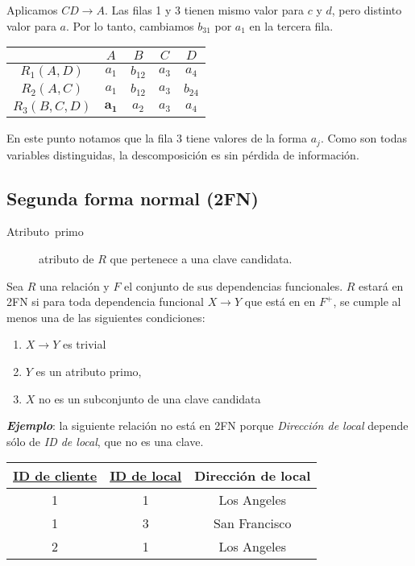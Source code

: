 \documentclass[a4paper, twoside]{article}
\begin{document}
Aplicamos $CD\to A$. Las filas 1 y 3 tienen mismo valor para $c$
y $d$, pero distinto valor para $a$. Por lo tanto, cambiamos $b_{31}$
por $a_{1}$ en la tercera fila.

\noindent \begin{center}
\begin{tabular}{|c|c|c|c|c|}
\hline 
 & $A$ & $B$ & $C$ & $D$\\
\hline 
\hline 
$R_{1}(A,D)$ & $a_{1}$ & $b_{12}$ & $a_{3}$ & $a_{4}$\\
\hline 
$R_{2}(A,C)$ & $a_{1}$ & $b_{12}$ & $a_{3}$ & $b_{24}$\\
\hline 
$R_{3}(B,C,D)$ & $\mathbf{a_{1}}$ & $a_{2}$ & $a_{3}$ & \textbf{$a_{4}$}\\
\hline 
\end{tabular}
\par\end{center}

En este punto notamos que la fila 3 tiene valores de la forma $a_{j}$.
Como son todas variables distinguidas, la descomposición es sin pérdida
de información.


\subsection{Segunda forma normal (2FN)}
\begin{description}
\item [{Atributo~primo}] atributo de $R$ que pertenece a una clave candidata.
\end{description}
Sea $R$ una relación y $F$ el conjunto de sus dependencias funcionales.
$R$ estará en 2FN si para toda dependencia funcional $X\to Y$ que
está en en $F^{+}$, se cumple al menos una de las siguientes condiciones:
\begin{enumerate}
\item $X\to Y$ es trivial
\item $Y$ es un atributo primo,
\item $X$ no es un subconjunto de una clave candidata
\end{enumerate}
\textbf{\emph{Ejemplo}}: la siguiente relación no está en 2FN porque
\emph{Dirección de local} depende sólo de \emph{ID de local}, que
no es una clave.

\noindent \begin{center}
\begin{tabular}{|c|c|c|}
\hline 
\uline{ID de cliente} & \uline{ID de local} & Dirección de local\\
\hline 
\hline 
1 & 1 & Los Angeles\\
\hline 
1 & 3 & San Francisco\\
\hline 
2 & 1 & Los Angeles\\
\hline 
\end{tabular}
\par\end{center}
\end{document}
